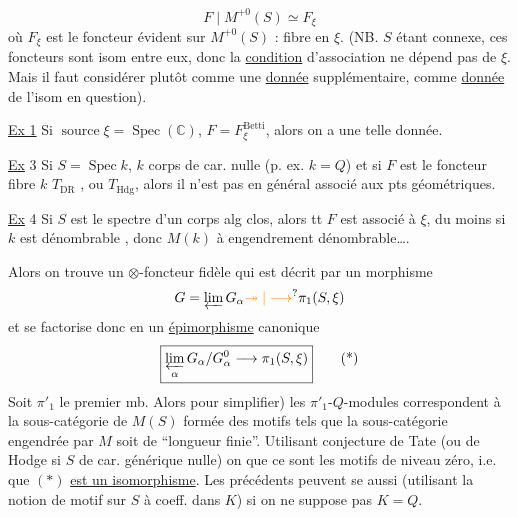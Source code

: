\[
F\mid M^{+0}(S)\simeq F_\xi
\]
où $F_\xi$ est le foncteur évident sur $M^{+0}(S)$ : fibre en $\xi$. (NB. $S$ étant connexe, ces foncteurs sont isom entre eux, donc la \uline{condition} d'association ne dépend pas de $\xi$. Mais il faut  considérer plutôt comme une \uline{donnée} supplémentaire, comme \uline{donnée} de l'isom en question).

\uline{Ex 1} Si $\operatorname{source}\xi=\operatorname{Spec}(\mathbb C)$,  $F=F^{\mathrm{Betti}}_\xi$, alors on a une telle donnée. 

\uline{Ex} 3 Si $S=\operatorname{Spec}k$, $k$ corps de car. nulle (p. ex. $k=Q$) et si $F$ est le foncteur fibre  $k$ $T_{\mathrm{DR}}$ , ou $T_{\mathrm{Hdg}}$, alors il n'est pas en général associé aux pts géométriques.

\uline{Ex} 4 Si  $S$ est le spectre d'un corps alg clos, alors tt $F$ est associé à $\xi$, du moins si $k$ est dénombrable , donc $M(k)$ à engendrement dénombrable\ldots .


Alors on trouve un $\otimes$-foncteur  fidèle
qui est décrit par un morphisme
\[
G=\varprojlim G_\alpha\unsure{\twoheadrightarrow|\longrightarrow}\pi_1(S,\xi)
\]
et se factorise donc en un \uline{épimorphisme} canonique
\[
\boxed{\varprojlim_{\alpha}G_\alpha/G_\alpha^0\longrightarrow\pi_1(S,\xi)}\tag*{(*)}
\]
Soit $\pi'_1$ le premier mb. Alors   pour simplifier) les $\pi'_1$-$Q$-modules correspondent à la sous-catégorie de $M(S)$ formée des motifs  tels que la sous-\inserted{$\otimes$-}catégorie engendrée par $M$ soit de ``longueur finie''. Utilisant conjecture de Tate (ou de Hodge si $S$ de car. générique nulle) on   que ce sont les motifs  de niveau  zéro,  i.e. que $(*)$ \uline{est un isomorphisme}. Les  précédents peuvent se  aussi (utilisant la notion de motif sur $S$ à coeff. dans $K$) si on ne suppose pas $K=Q$.

